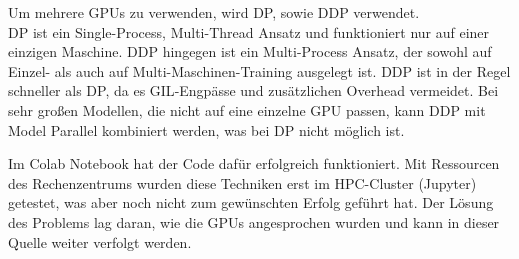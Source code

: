 \documentclass[german,report]{i1thesis}
\begin{document}





Um mehrere \acp{GPU} zu verwenden, wird \ac{DP}, sowie \ac{DDP} verwendet.\\
\ac{DP} ist ein Single-Process, Multi-Thread Ansatz und funktioniert nur auf einer einzigen Maschine.
\ac{DDP} hingegen ist ein Multi-Process Ansatz, der sowohl auf Einzel- als auch auf Multi-Maschinen-Training ausgelegt ist.
\ac{DDP} ist in der Regel schneller als \ac{DP}, da es \ac{GIL}-Engpässe und zusätzlichen Overhead vermeidet.
Bei sehr großen Modellen, die nicht auf eine einzelne \ac{GPU} passen, kann \ac{DDP} mit Model Parallel kombiniert werden, was bei \ac{DP} nicht möglich ist. \autocite{ddp}


Im Colab Notebook hat der Code dafür erfolgreich funktioniert.
Mit Ressourcen des Rechenzentrums wurden diese Techniken erst im \ac{HPC}-Cluster (Jupyter) getestet, was aber noch nicht zum gewünschten Erfolg geführt hat.
Der Lösung des Problems lag daran, wie die \acp{GPU} angesprochen wurden und kann in dieser Quelle weiter verfolgt werden. \autocite{problem}


\end{document}
